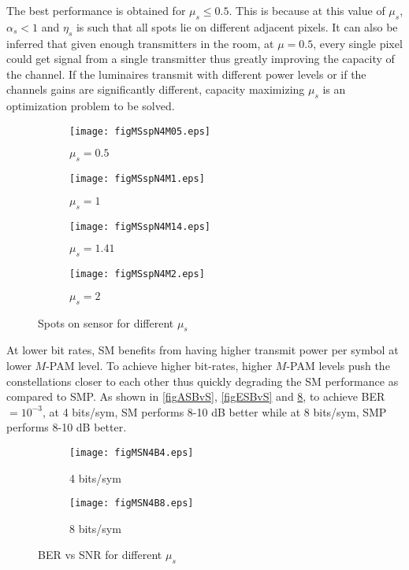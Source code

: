 The best performance is obtained for $\mu_{s}\leq 0.5$. This is because at this value of $\mu_{s}$, $\alpha_{s}<1$ and $\eta_{s}$ is such that all spots lie on different adjacent pixels. It can also be inferred that given enough transmitters in the room, at $\mu=0.5$, every single pixel could get signal from a single transmitter thus greatly improving the capacity of the channel. If the luminaires transmit with different power levels or if the channels gains are significantly different, capacity maximizing $\mu_{s}$ is an optimization problem to be solved.

\begin{figure}[!t]
	\centering
		\begin{subfigure}{0.49\textwidth}
			\centering
			\texttt{[image: figMSspN4M05.eps]}
			\caption{$\mu_{s}=0.5$}
			\label{figMSspN4M05}
		\end{subfigure}
		\hfill
		\begin{subfigure}{0.49\textwidth}
			\centering
			\texttt{[image: figMSspN4M1.eps]}
			\caption{$\mu_{s}=1$}
			\label{figMSspN4M1}
		\end{subfigure}
		\vfill
		\begin{subfigure}{0.49\textwidth}
			\centering
			\texttt{[image: figMSspN4M14.eps]}
			\caption{$\mu_{s}=1.41$}
			\label{figMSspN4M14}
		\end{subfigure}
		\hfill
		\begin{subfigure}{0.49\textwidth}
			\centering
		\texttt{[image: figMSspN4M2.eps]}
			\caption{$\mu_{s}=2$}
			\label{figMSspN4M2}
		\end{subfigure}
		\caption{Spots on sensor for different $\mu_{s}$}
		\label{figMSSpots}
\end{figure}

At lower bit rates, SM benefits from having higher transmit power per symbol at lower $M$-PAM level. To achieve higher bit-rates, higher $M$-PAM levels push the constellations closer to each other thus quickly degrading the SM performance as compared to SMP. As shown in \figurename{ \ref{figASBvS}}, \figurename{ \ref{figESBvS}} and \figurename{ \ref{figMSBvS}}, to achieve BER $=10^{-3}$, at 4 bits/sym, SM performs 8-10 dB better while at 8 bits/sym, SMP performs 8-10 dB better.

	\begin{figure}[!t]
		\centering
			\begin{subfigure}{\textwidth}
				\centering
				\texttt{[image: figMSN4B4.eps]}
				\caption{4 bits/sym}
				\label{figMSN4B4}
			\end{subfigure}
			
			\begin{subfigure}{\textwidth}
				\centering
				\texttt{[image: figMSN4B8.eps]}
				\caption{8 bits/sym}
				\label{figMSN4B8}
			\end{subfigure}
			
			\caption{BER vs SNR for different $\mu_{s}$}
			\label{figMSBvS}
	\end{figure}
	\clearpage%

